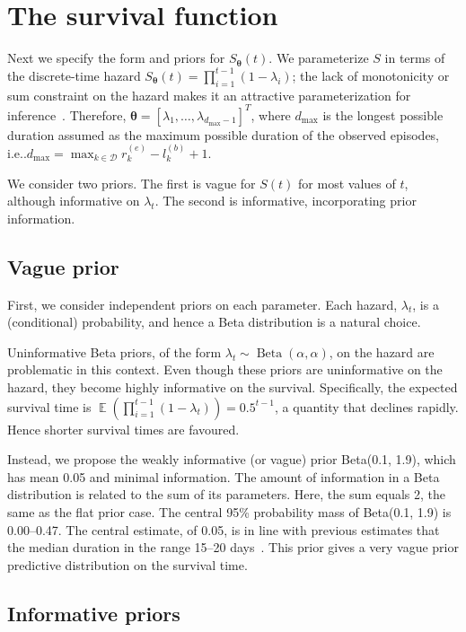 \documentclass[12pt]{article}
\makeatletter
\def\dist{\sim}
\DeclareMathOperator{\E}{\mathbb{E}}
\DeclareMathOperator{\BetaDist}{Beta}
\newcommand\set{\mathcal}
\renewcommand{\vec}[1]{\bm{#1}}
\newcommand{\dmax}{d_\text{max}}
\DeclareRobustCommand\onedot{\futurelet\@let@token\@onedot}
\def\@onedot{\ifx\@let@token.\else.\null\fi\xspace}
\def\ie{i.e\onedot} \def\Ie{{I.e}\onedot}
\makeatother
\begin{document}
\section{The survival function} \label{sec:parameters-priors}

Next we specify the form and priors for $S_{\vec{\theta}}(t)$.
We parameterize $S$ in terms of the discrete-time hazard $S_{\vec{\theta}}(t) = \prod_{i=1}^{t-1} (1 - \lambda_{i})$; the lack of monotonicity or sum constraint on the hazard makes it an attractive parameterization for inference~\citep{heBayesian}.
Therefore, $\vec{\theta} = [\lambda_1, \dots, \lambda_{\dmax-1}]^T$, where $\dmax$ is the longest possible duration assumed as the maximum possible duration of the observed episodes, \ie $\dmax = \max_{k \in \set{D}} r^{(e)}_k - l^{(b)}_k + 1$.

We consider two priors.
The first is vague for $S(t)$ for most values of $t$, although informative on $\lambda_t$.
The second is informative, incorporating prior information.


\subsection{Vague prior} \label{sec:vague-prior}

First, we consider independent priors on each parameter.
Each hazard, $\lambda_t$, is a (conditional) probability, and hence a Beta distribution is a natural choice.

Uninformative Beta priors, of the form $\lambda_t \dist \BetaDist(\alpha, \alpha)$, on the hazard are problematic in this context.
Even though these priors are uninformative on the hazard, they become highly informative on the survival. 
Specifically, the expected survival time is $\E \left( \prod_{i=1}^{t-1} (1-\lambda_t) \right) = 0.5^{t-1}$, a quantity that declines rapidly. Hence shorter survival times are favoured.

Instead, we propose the weakly informative (or vague) prior Beta(0.1, 1.9), which has mean 0.05 and minimal information.
The amount of information in a Beta distribution is related to the sum of its parameters.
Here, the sum equals 2, the same as the flat prior case.
The central 95\% probability mass of Beta(0.1, 1.9) is 0.00--0.47.
The central estimate, of 0.05, is in line with previous estimates that the median duration in the range 15--20 days~\citep{cevikShedding}.
This prior gives a very vague prior predictive distribution on the survival time.

\subsection{Informative priors} \label{sec:informative-prior}
\end{document}
